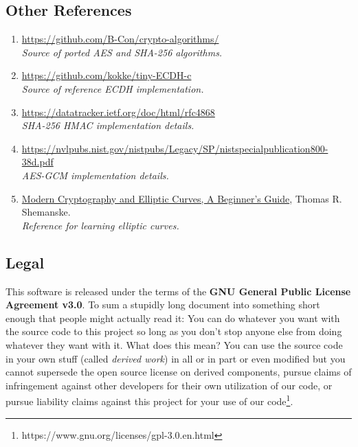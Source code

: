 \documentclass[titlepage]{report}
\begin{document}
	\subsection{Other References}\small
	\begin{enumerate}
		\item[1] \ul{https://github.com/B-Con/crypto-algorithms/}\\\textit{Source of ported AES and SHA-256 algorithms.}
		
		\item[2] \ul{https://github.com/kokke/tiny-ECDH-c}\\\textit{Source of reference ECDH implementation.}
		
		\item[4] \ul{https://datatracker.ietf.org/doc/html/rfc4868}\\\textit{SHA-256 HMAC implementation details.}
		
		\item[5] \ul{https://nvlpubs.nist.gov/nistpubs/Legacy/SP/nistspecialpublication800-38d.pdf}\\\textit{AES-GCM implementation details.}
		
		\item[6] \ul{Modern Cryptography and Elliptic Curves, A Beginner's Guide}, Thomas R. Shemanske.\\
		\textit{Reference for learning elliptic curves.}
	\end{enumerate}
	
	\subsection{Legal}\small
	This software is released under the terms of the \textbf{GNU General Public License Agreement v3.0}. To sum a stupidly long document into something short enough that people might actually read it: You can do whatever you want with the source code to this project so long as you don't stop anyone else from doing whatever they want with it. What does this mean? You can use the source code in your own stuff (called \textit{derived work}) in all or in part or even modified but you cannot supersede the open source license on derived components, pursue claims of infringement against other developers for their own utilization of our code, or pursue liability claims against this project for your use of our code\footnote{https://www.gnu.org/licenses/gpl-3.0.en.html}. 
	
	
\end{document}
